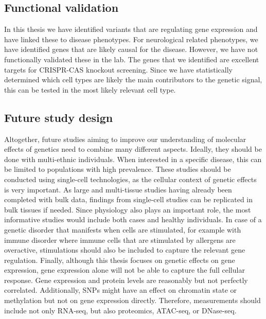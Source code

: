 \subsection{Functional validation}

In this thesis we have identified variants that are regulating gene expression and have linked these to disease phenotypes. For neurological related phenotypes, we have identified genes that are likely causal for the disease. However, we have not functionally validated these in the lab. The genes that we identified are excellent targets for CRISPR-CAS knockout screening\cite{agrotisNewAgeFunctional2015}. Since we have statistically determined which cell types are likely the main contributors to the genetic signal, this can be tested in the most likely relevant cell type. 

\subsection{Future study design}
Altogether, future studies aiming to improve our understanding of molecular effects of genetics need to combine many different aspects. Ideally, they should be done with multi-ethnic individuals. When interested in a specific disease, this can be limited to populations with high prevalence. These studies should be conducted using single-cell technologies, as the cellular context of genetic effects is very important. As large\cite{vosaUnravelingPolygenicArchitecture2018} and multi-tissue\cite{thegtexconsortiumGTExConsortiumAtlas2020} studies having already been completed with bulk data, findings from single-cell studies can be replicated in bulk tissues if needed. Since physiology also plays an important role, the most informative studies would include both cases and healthy individuals. In case of a genetic disorder that manifests when cells are stimulated, for example with immune disorder where immune cells that are stimulated by allergens are overactive, stimulations should also be included to capture the relevant gene regulation. Finally, although this thesis focuses on genetic effects on gene expression, gene expression alone will not be able to capture the full cellular response. Gene expression and protein levels are reasonably but not perfectly correlated\cite{buccitelliMRNAsProteinsEmerging2020}. Additionally, SNPs might have an effect on chromatin state or methylation but not on gene expression directly. Therefore, measurements should include not only RNA-seq, but also proteomics, ATAC-seq, or DNase-seq. 

